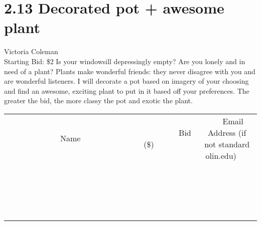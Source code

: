 \documentclass[11pt]{article}
\begin{document}
\section*{2.13 Decorated pot + awesome plant}
Victoria Coleman
\\
Starting Bid: \$2
\newline
Is your windowsill depressingly empty? Are you lonely and in need of a plant? Plants make wonderful friends: they never disagree with you and are wonderful listeners. I will decorate a pot based on imagery of your choosing and find an awesome, exciting plant to put in it based off your preferences. The greater the bid, the more classy the pot and exotic the plant.
\\[3ex]
\begin{tabular}{c c c}
~~~~~~~~~~~~~Name~~~~~~~~~~~~~ & ~~~~~~~~~Bid (\$)~~~~~~~~~  & ~~~Email Address (if not standard olin.edu)~~~\\
 & & \\
\hline
 & & \\
\hline
 & & \\
\hline
 & & \\
\hline
 & & \\
\hline
 & & \\
\hline
 & & \\
\hline
 & & \\
\hline
 & & \\
\hline
 & & \\
\hline
 & & \\
\hline
 & & \\
\hline
 & & \\
\hline
 & & \\
\hline
 & & \\
\hline
 & & \\
\hline
 & & \\
\hline
 & & \\
\hline
 & & \\
\hline
\end{tabular}
\newpage
\end{document}

